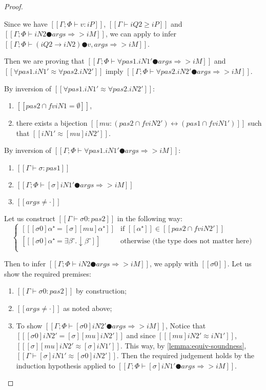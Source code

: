 \begin{proof}
\begin{caseof}
            Since we have $[[Γ ; Φ ⊢ v : iP]]$, $[[Γ ⊢ iQ2 ≥ iP]]$ and 
            $[[Γ ; Φ ⊢ iN2 ● args ⇒> iM]]$, we can apply 
            to infer $[[Γ; Φ ⊢ (iQ2 → iN2) ● v, args ⇒> iM]]$.

        \item {}
            Then we are proving that 
            $[[Γ ; Φ ⊢ ∀pas1.iN1' ● args ⇒> iM]]$ and $[[∀pas1.iN1' ≈ ∀pas2.iN2']]$
            imply $[[Γ ; Φ ⊢ ∀pas2.iN2' ● args ⇒> iM]]$.


            By inversion of $[[∀pas1.iN1' ≈ ∀pas2.iN2']]$:
            \begin{enumerate}
                \item $[[{pas2} ∩ fv iN1 = ∅]]$,
                \item there exists a bijection 
                    $[[mu : ({pas2} ∩ fv iN2') ↔ ({pas1} ∩ fv iN1')]]$
                    such that $[[iN1' ≈ [mu] iN2']]$.
            \end{enumerate}

            By inversion of $[[Γ ; Φ ⊢ ∀pas1.iN1' ● args ⇒> iM]]$:
            \begin{enumerate}
                \item $[[Γ ⊢ σ :{pas1}]]$        
                \item $[[Γ ; Φ ⊢ [σ]iN1' ● args ⇒> iM]]$
                \item $[[args ≠ ·]]$
            \end{enumerate}

            Let us construct $[[Γ ⊢ σ0 :{pas2}]]$ in the following way:
            $$
            \begin{cases}
                [[ [σ0]α⁺ =  [σ][mu]α⁺ ]] & \text{if } [[α⁺]] \in [[ {pas2} ∩ fv iN2' ]] \\
                [[ [σ0]α⁺ =  ∃β⁻.↓β⁻ ]] & \text{otherwise (the type does not matter here)} \\
            \end{cases}
            $$

            Then to infer $[[Γ ; Φ ⊢ iN2 ● args ⇒> iM]]$, we 
            apply  with $[[σ0]]$. 
            Let us show the required premises:
            \begin{enumerate}
                \item $[[Γ ⊢ σ0 :{pas2}]]$ by construction;
                \item $[[args ≠ ·]]$ as noted above;
                \item To show $[[Γ ; Φ ⊢ [σ0]iN2' ● args ⇒> iM]]$,
                Notice that $[[ [σ0]iN2' = [σ][mu]iN2' ]]$   
                and since $[[ [mu]iN2' ≈ iN1' ]]$, $[[ [σ][mu]iN2' ≈ [σ]iN1' ]]$.
                This way, by \cref{lemma:equiv-soundness}, $[[Γ ⊢ [σ]iN1' ≈ [σ0]iN2']]$.
                Then the required judgement holds by the induction hypothesis
                applied to $[[Γ ; Φ ⊢ [σ]iN1' ● args ⇒> iM]]$.
            \end{enumerate}
    \end{caseof}
\end{proof}

